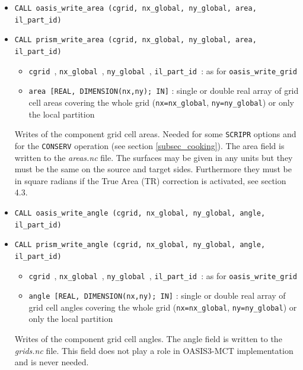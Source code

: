 \begin{itemize}
\begin{itemize}
  \end{itemize}
  Writes the component grid cell fractions.  This should be consistent
  with the mask field and defines the fraction of the grid cell that
  is active (i.e. not masked).  The fraction field is only used in the
  global {\tt CONSERV} operations. Either the mask or fractions must be defined for that operation.  If both are defined, they must be consistent; OASIS3-MCT will abort if they are not coherent or if both are missing.  Note that by OASIS3-MCT conventions for the mask, a gridcell with mask=0 (active) should have a fractions greater than 0 and a gridcell with mask=1 (inactive) should have a fractions equal to 0.  The fraction field is written to the {\em masks.nc} file.

  \vspace{0.2cm}
\item {\tt CALL oasis\_write\_area (cgrid, nx\_global, ny\_global, area, il\_part\_id)}
\item {\tt CALL prism\_write\_area (cgrid, nx\_global, ny\_global, area, il\_part\_id)}

  \begin{itemize}
  \item {\tt cgrid }, {\tt nx\_global }, {\tt ny\_global }, {\tt il\_part\_id }: as for {\tt oasis\_write\_grid}
  \item {\tt area [REAL, DIMENSION(nx,ny); IN]} : single or double real array of grid cell
    areas covering the whole grid ({\tt nx=nx\_global}, {\tt ny=ny\_global}) or only the local partition 
  \end{itemize}
  Writes of the component grid cell areas. Needed for some {\tt SCRIPR} options and for the {\tt CONSERV}
  operation (see section \ref{subsec_cooking}).    The area field is written to the {\em areas.nc} file.
  The surfaces may be given in any units but they must be the same on
  the source and target sides. Furthermore they must be in square radians if the True Area (TR) correction is activated, see section 4.3.

  \vspace{0.2cm}
\item {\tt CALL oasis\_write\_angle (cgrid, nx\_global, ny\_global, angle, il\_part\_id)}
\item {\tt CALL prism\_write\_angle (cgrid, nx\_global, ny\_global, angle, il\_part\_id)}

  \begin{itemize}
  \item {\tt cgrid }, {\tt nx\_global }, {\tt ny\_global }, {\tt il\_part\_id }: as for {\tt oasis\_write\_grid}
  \item {\tt angle [REAL, DIMENSION(nx,ny); IN]} : single or double real array of grid cell
    angles covering the whole grid ({\tt nx=nx\_global}, {\tt ny=ny\_global}) or only the local partition 
  \end{itemize}
  Writes of the component grid cell angles.  The angle field is written to the {\em grids.nc} file.  This field does not play a role in OASIS3-MCT implementation and is never needed.



\end{itemize}
